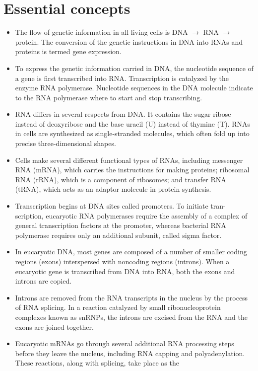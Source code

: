 \section{Essential concepts}

\begin{itemize}
\item The flow of genetic information in all living cells is DNA $\rightarrow$ RNA $\rightarrow$
protein. The conversion of the genetic instructions in DNA into RNAs
and proteins is termed gene expression.
\item To express the genetic information carried in DNA, the nucleotide
sequence of a gene is first transcribed into RNA. Transcription is catalyzed by the enzyme RNA polymerase. Nucleotide sequences in the
DNA molecule indicate to the RNA polymerase where to start and
stop transcribing.
\item RNA differs in several respects from DNA. It contains the sugar ribose
instead of deoxyribose and the base uracil (U) instead of thymine (T).
RNAs in cells are synthesized as single-stranded molecules, which
often fold up into precise three-dimensional shapes.
\item Cells make several different functional types of RNAs, including
messenger RNA (mRNA), which carries the instructions for making
proteins; ribosomal RNA (rRNA), which is a component of ribosomes;
and transfer RNA (tRNA), which acts as an adaptor molecule in protein synthesis.
\item Transcription begins at DNA sites called promoters. To initiate tran-
scription, eucaryotic RNA polymerases require the assembly of a
complex of general transcription factors at the promoter, whereas
bacterial RNA polymerase requires only an additional subunit, called
sigma factor.
\item In eucaryotic DNA, most genes are composed of a number of smaller
coding regions (exons) interspersed with noncoding regions (introns).
When a eucaryotic gene is transcribed from DNA into RNA, both the
exons and introns are copied.
\item Introns are removed from the RNA transcripts in the nucleus by the
process of RNA splicing. In a reaction catalyzed by small ribonucleoprotein
complexes known as snRNPs, the introns are excised from
the RNA and the exons are joined together.
\item Eucaryotic mRNAs go through several additional RNA processing
steps before they leave the nucleus, including RNA capping and polyadenylation.
These reactions, along with splicing, take place as the

\end{itemize}
